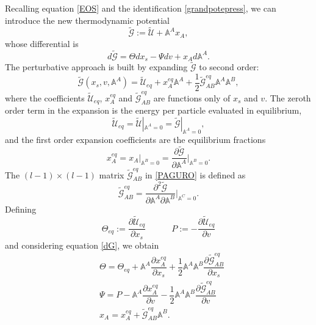 \documentclass[useAMS,usenatbib,prd,twocolumn,nofootinbib]{revtex4-1}
\newcommand{\spc}{\quad \quad \quad}
\begin{document}
Recalling equation \eqref{EOS} and the identification \eqref{grandpotepress}, we can introduce the new thermodynamic potential
\begin{equation}\label{legendrandotogavassino}
\tilde{\mathcal{G}} := \tilde{\mathcal{U}} +  \mathbb{A}^A x_A ,
\end{equation}
whose differential is
\begin{equation}\label{dG}
d\tilde{\mathcal{G}} = \Theta dx_s - \Psi dv  +  x_A d\mathbb{A}^A .
\end{equation}
The perturbative approach is built by expanding $\tilde{\mathcal{G}}$ to second order:
\begin{equation}
\tilde{\mathcal{G}}(x_s,v,\mathbb{A}^A) = \tilde{\mathcal{U}}_{eq} + x_A^{eq}\mathbb{A}^A + \dfrac{1}{2}  \tilde{\mathcal{G}}_{AB}^{eq} \mathbb{A}^A \mathbb{A}^B,
\label{PAGURO}
\end{equation}
where the coefficients $\tilde{\mathcal{U}}_{eq}$, $x_A^{eq}$ and $\tilde{\mathcal{G}}_{AB}^{eq}$ are functions only of $x_s$ and $v$. The zeroth order term in the expansion is the energy per particle evaluated in equilibrium,
\begin{equation}
\tilde{\mathcal{U}}_{eq} =\tilde{\mathcal{U}}|_{\mathbb{A}^A =0} =\tilde{ \mathcal{G}}|_{\mathbb{A}^A =0},
\end{equation}
and the first order expansion coefficients are the equilibrium fractions
\begin{equation}
x_A^{eq} = x_A|_{\mathbb{A}^B=0} = \dfrac{\partial \tilde{\mathcal{G}}}{\partial \mathbb{A}^A} \bigg|_{\mathbb{A}^B=0}.
\end{equation}
The $(l-1)\times (l-1)$ matrix $\tilde{\mathcal{G}}_{AB}^{eq}$ in \eqref{PAGURO} is defined as
\begin{equation}
\tilde{\mathcal{G}}_{AB}^{eq} = \dfrac{\partial^2 \tilde{\mathcal{G}}}{\partial \mathbb{A}^A \partial \mathbb{A}^B} \bigg|_{\mathbb{A}^C =0}.
\end{equation}
Defining 
\begin{equation}\label{zsefvgy}
\Theta_{eq}:= \dfrac{\partial \tilde{\mathcal{U}}_{eq}}{\partial x_s}  \spc  P := -\dfrac{\partial \tilde{\mathcal{U}}_{eq}}{\partial v} 
\end{equation}
and considering equation \eqref{dG}, we obtain
\begin{equation}\label{uuuuuuu}
\begin{split}
& \Theta = \Theta_{eq} +  \mathbb{A}^A \dfrac{\partial x_A^{eq}}{\partial x_s} + \dfrac{1}{2}   \mathbb{A}^A \mathbb{A}^B \dfrac{\partial \tilde{\mathcal{G}}_{AB}^{eq}}{\partial x_s} \\
& \Psi = P - \mathbb{A}^A \dfrac{\partial x_A^{eq}}{\partial v} - \dfrac{1}{2}  \mathbb{A}^A \mathbb{A}^B \dfrac{\partial \tilde{\mathcal{G}}_{AB}^{eq}}{\partial v} \\
& x_A = x_A^{eq} + \tilde{\mathcal{G}}_{AB}^{eq} \mathbb{A}^B . \\
\end{split}
\end{equation}
\end{document}
